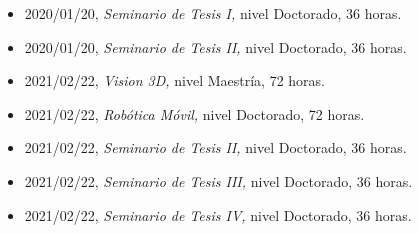 \begin{itemize}
\item 2020/01/20, \textit{ Seminario de Tesis I,} nivel Doctorado, 36 horas. 
\item 2020/01/20, \textit{ Seminario de Tesis II,} nivel Doctorado, 36 horas. 
\item 2021/02/22, \textit{ Vision 3D,} nivel Maestría, 72 horas. 
\item 2021/02/22, \textit{ Robótica Móvil,} nivel Doctorado, 72 horas. 
\item 2021/02/22, \textit{ Seminario de Tesis II,} nivel Doctorado, 36 horas. 
\item 2021/02/22, \textit{ Seminario de Tesis III,} nivel Doctorado, 36 horas. 
\item 2021/02/22, \textit{ Seminario de Tesis IV,} nivel Doctorado, 36 horas. 
\end{itemize} 
